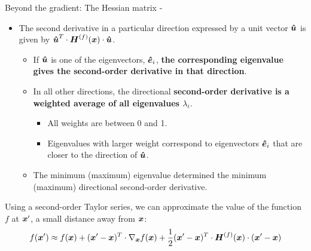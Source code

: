 \begin{frame}[t,allowframebreaks]{
    Beyond the gradient: The Hessian matrix -}

    \begin{itemize}
        \item 
        The second derivative in a particular direction
        expressed by a unit vector $\boldsymbol{\hat{u}}$ is given by
        $\displaystyle \boldsymbol{\hat{u}}^T \cdot \boldsymbol{H}^{(f)}(\boldsymbol{x}) \cdot \boldsymbol{\hat{u}}$.
        \begin{itemize}
            \item If $\boldsymbol{\hat{u}}$ is one of the 
            \glspl{eigenvector}, $\boldsymbol{\hat{e}}_i$,
            {\bf the corresponding 
            \gls{eigenvalue} gives the second-order 
            derivative in that direction}.
            \item In all other directions, the directional 
            {\bf second-order derivative is 
            a weighted average of all \glspl{eigenvalue} $\lambda_{i}$}.
            \begin{itemize}
                \item All weights are between 0 and 1.
                \item Eigenvalues with larger weight correspond to \glspl{eigenvector}
                $\boldsymbol{\hat{e}}_i$ that are closer to the direction of $\boldsymbol{\hat{u}}$.
            \end{itemize}
            \item The minimum (maximum) \gls{eigenvalue} determined the minimum (maximum)
            directional second-order derivative.
        \end{itemize}
    
    \end{itemize}

    \framebreak


    Using a second-order \gls{Taylor series}, we can approximate 
    the value of the function $f$ at $\boldsymbol{x}^\prime$, 
    a small distance away from $\boldsymbol{x}$:
    \vspace{-0.1cm}
    \begin{equation}
        f(\boldsymbol{x}^\prime) \approx 
          f(\boldsymbol{x}) + 
          (\boldsymbol{x}^\prime - \boldsymbol{x})^T \cdot \nabla_{\boldsymbol{x}}f(\boldsymbol{x}) +
          \frac{1}{2} (\boldsymbol{x}^\prime - \boldsymbol{x})^T \cdot 
            \boldsymbol{H}^{(f)}(\boldsymbol{x}) \cdot (\boldsymbol{x}^\prime - \boldsymbol{x})
        \label{eq:hessian_taylor_1}
    \end{equation}


\end{frame}
